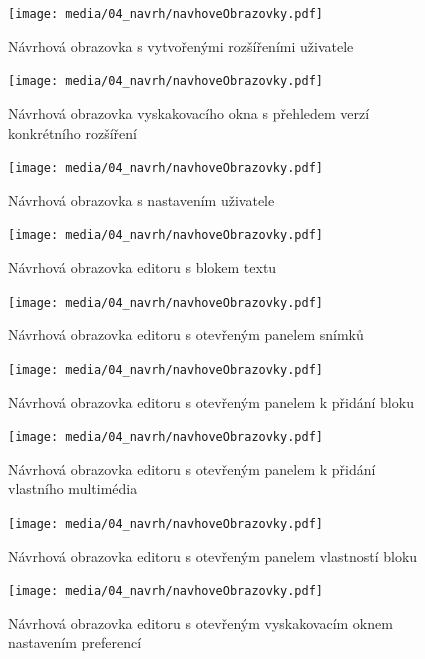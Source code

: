 \begin{figure}[ht!]
    \centering
    \texttt{[image: media/04\_navrh/navhoveObrazovky.pdf]}
    \caption{Návrhová obrazovka s vytvořenými rozšířeními uživatele}
\end{figure}

\begin{figure}[ht!]
    \centering
    \texttt{[image: media/04\_navrh/navhoveObrazovky.pdf]}
    \caption{Návrhová obrazovka vyskakovacího okna s přehledem verzí konkrétního rozšíření}
\end{figure}


\begin{figure}[ht!]
    \centering
    \texttt{[image: media/04\_navrh/navhoveObrazovky.pdf]}
    \caption{Návrhová obrazovka s nastavením uživatele}
\end{figure}

\begin{figure}[ht!]
    \centering
    \texttt{[image: media/04\_navrh/navhoveObrazovky.pdf]}
    \caption{Návrhová obrazovka editoru s blokem textu}
\end{figure}

\begin{figure}[ht!]
    \centering
    \texttt{[image: media/04\_navrh/navhoveObrazovky.pdf]}
    \caption{Návrhová obrazovka editoru s otevřeným panelem snímků}
\end{figure}


\begin{figure}[ht!]
    \centering
    \texttt{[image: media/04\_navrh/navhoveObrazovky.pdf]}
    \caption{Návrhová obrazovka editoru s otevřeným panelem k přidání bloku}
\end{figure}


\begin{figure}[ht!]
    \centering
    \texttt{[image: media/04\_navrh/navhoveObrazovky.pdf]}
    \caption{Návrhová obrazovka editoru s otevřeným panelem k přidání vlastního multimédia}
\end{figure}


\begin{figure}[ht!]
    \centering
    \texttt{[image: media/04\_navrh/navhoveObrazovky.pdf]}
    \caption{Návrhová obrazovka editoru s otevřeným panelem vlastností bloku}
\end{figure}


\begin{figure}[ht!]
    \centering
    \texttt{[image: media/04\_navrh/navhoveObrazovky.pdf]}
    \caption{Návrhová obrazovka editoru s otevřeným vyskakovacím oknem nastavením preferencí}
\end{figure}

